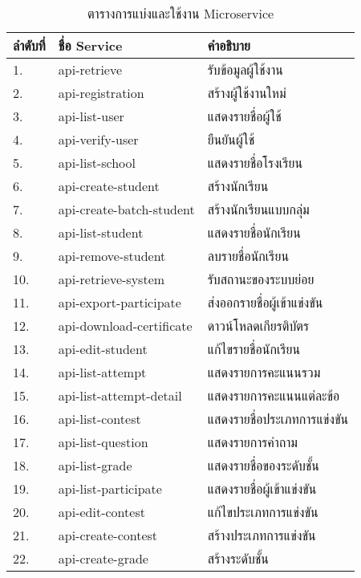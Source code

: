 \begin{longtable}{ | p{} | p{} | p{} | }
\caption{ตารางการแบ่งและใช้งาน Microservice}
\label{tab:api-mapping} \\
    \hline
    \textbf{ลำดับที่} & \textbf{ชื่อ Service} & \textbf{คำอธิบาย} \\
    \hline
    1. & api-retrieve & รับข้อมูลผู้ใช้งาน \\
    \hline
    2. & api-registration & สร้างผู้ใช้งานใหม่ \\
    \hline
    3. & api-list-user & แสดงรายชื่อผู้ใช้ \\
    \hline
    4. & api-verify-user & ยืนยันผู้ใช้ \\
    \hline
    5. & api-list-school & แสดงรายชื่อโรงเรียน \\
    \hline
    6. & api-create-student & สร้างนักเรียน \\
    \hline
    7. & api-create-batch-student & สร้างนักเรียนแบบกลุ่ม \\
    \hline
    8. & api-list-student & แสดงรายชื่อนักเรียน \\
    \hline
    9. & api-remove-student & ลบรายชื่อนักเรียน \\
    \hline
    10. & api-retrieve-system & รับสถานะของระบบย่อย \\
    \hline
    11. & api-export-participate & ส่งออกรายชื่อผู้เข้าแข่งขัน \\
    \hline
    12. & api-download-certificate & ดาวน์โหลดเกียรติบัตร \\
    \hline
    13. & api-edit-student & แก้ไขรายชื่อนักเรียน \\
    \hline
    14. & api-list-attempt & แสดงรายการคะแนนรวม \\
    \hline
    15. & api-list-attempt-detail & แสดงรายการคะแนนแต่ละข้อ \\
    \hline
    16. & api-list-contest & แสดงรายชื่อประเภทการแข่งขัน \\
    \hline
    17. & api-list-question & แสดงรายการคำถาม \\
    \hline
    18. & api-list-grade & แสดงรายชื่อของระดับชั้น \\
    \hline
    19. & api-list-participate & แสดงรายชื่อผู้เข้าแข่งขัน \\
    \hline
    20. & api-edit-contest & แก้ไขประเภทการแข่งขัน \\
    \hline
    21. & api-create-contest & สร้างประเภทการแข่งขัน \\
    \hline
    22. & api-create-grade & สร้างระดับชั้น \\

\end{longtable}
